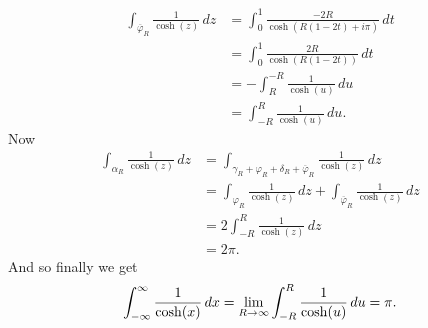 \begin{parts}
\begin{solution}
\begin{align*}
            \int_{\overline\varphi_R} \frac{1}{\cosh(z)} \,dz
            &= \int_0^1 \frac{-2R}{\cosh(R(1-2t) + i\pi)} \, dt \\
            &= \int_0^1 \frac{2R}{\cosh(R(1-2t))} \, dt \\
            &= -\int_{R}^{-R} \frac{1}{\cosh(u)} \,du \\
            &= \int_{-R}^{R} \frac{1}{\cosh(u)} \,du.
        \end{align*}
        Now
        \begin{align*}
            \int_{\alpha_R} \frac{1}{\cosh(z)} \,dz
            &= \int_{\gamma_R + \varphi_R + \delta_R + \overline\varphi_R}
                \frac{1}{\cosh(z)} \,dz \\
            &= \int_{\varphi_R} \frac{1}{\cosh(z)} \,dz
                + \int_{\overline\varphi_R} \frac{1}{\cosh(z)} \,dz \\
            &= 2\int_{-R}^R \frac{1}{\cosh(z)} \,dz \\
            &= 2\pi.
        \end{align*}
        And so finally we get
        \[
            \int_{-\infty}^{\infty} \frac{1}{\cosh(x)} \,dx
            = \lim_{R \to \infty} \int_{-R}^{R} \frac{1}{\cosh(u)} \,du
            = \pi.
        \]
    \end{solution}
\end{parts}

